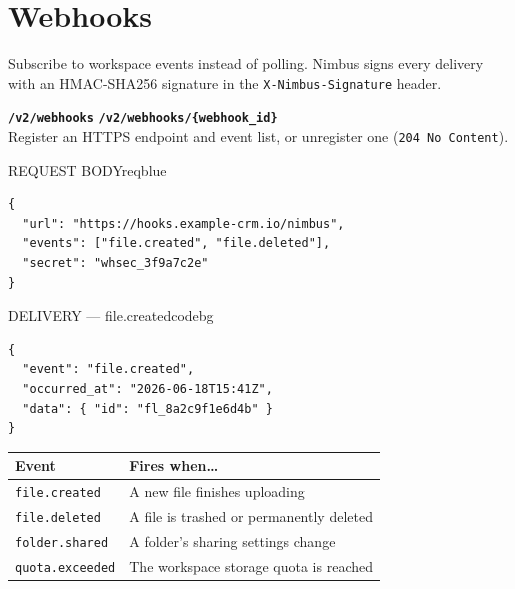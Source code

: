 \section{Webhooks}
Subscribe to workspace events instead of polling. Nimbus signs every delivery with an
HMAC-SHA256 signature in the \texttt{X-Nimbus-Signature} header.

\begin{routebox}
\hspace{6pt}\texttt{\textbf{/v2/webhooks}}\hspace{10pt}
\hspace{6pt}\texttt{\textbf{/v2/webhooks/\{webhook\_id\}}}\\[3pt]
{\small Register an HTTPS endpoint and event list, or unregister one (\texttt{204 No
Content}).}
\end{routebox}

\begin{minipage}[t]{0.48\textwidth}
\begin{jsonpanel}{REQUEST BODY}{reqblue}
\begin{lstlisting}
{
  "url": "https://hooks.example-crm.io/nimbus",
  "events": ["file.created", "file.deleted"],
  "secret": "whsec_3f9a7c2e"
}
\end{lstlisting}
\end{jsonpanel}
\end{minipage}\hfill
\begin{minipage}[t]{0.48\textwidth}
\begin{jsonpanel}{DELIVERY — file.created}{codebg}
\begin{lstlisting}
{
  "event": "file.created",
  "occurred_at": "2026-06-18T15:41Z",
  "data": { "id": "fl_8a2c9f1e6d4b" }
}
\end{lstlisting}
\end{jsonpanel}
\end{minipage}
\par

\begin{center}
\begin{tabularx}{0.85\linewidth}{@{}l X@{}}
\toprule
\rowcolor{panelgray}
\textbf{Event} & \textbf{Fires when\dots} \\
\midrule
\texttt{file.created} & A new file finishes uploading \\
\texttt{file.deleted} & A file is trashed or permanently deleted \\
\texttt{folder.shared} & A folder's sharing settings change \\
\texttt{quota.exceeded} & The workspace storage quota is reached \\
\bottomrule
\end{tabularx}
\end{center}

